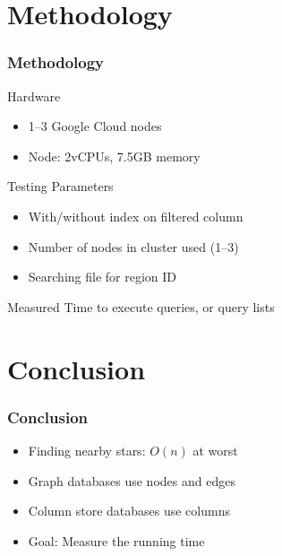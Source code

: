\documentclass[11pt]{beamer}
\begin{document}
    \section{Methodology}\label{sec:methodology}
    \begin{frame}
        \frametitle{Methodology}
        \begin{block}{Hardware}
            \begin{itemize}
                \item 1--3 Google Cloud nodes
                \item Node: 2vCPUs, 7.5GB memory
            \end{itemize}
        \end{block}
        \begin{block}{Testing Parameters}
            \begin{itemize}
                \item With/without index on filtered column
                \item Number of nodes in cluster used (1--3)
                \item Searching file for region ID
            \end{itemize}
        \end{block}
        \begin{block}{Measured}
            Time to execute queries, or query lists
        \end{block}
    \end{frame}

    \section{Conclusion}\label{sec:conclusion}
    \begin{frame}
        \frametitle{Conclusion}
        \begin{itemize}
            \item Finding nearby stars: $O(n)$ at worst \bigskip
            \item Graph databases use nodes and edges \bigskip
            \item Column store databases use columns \bigskip
            \item Goal: Measure the running time
        \end{itemize}
    \end{frame}

    \begin{frame}
    \end{frame}
\end{document}
